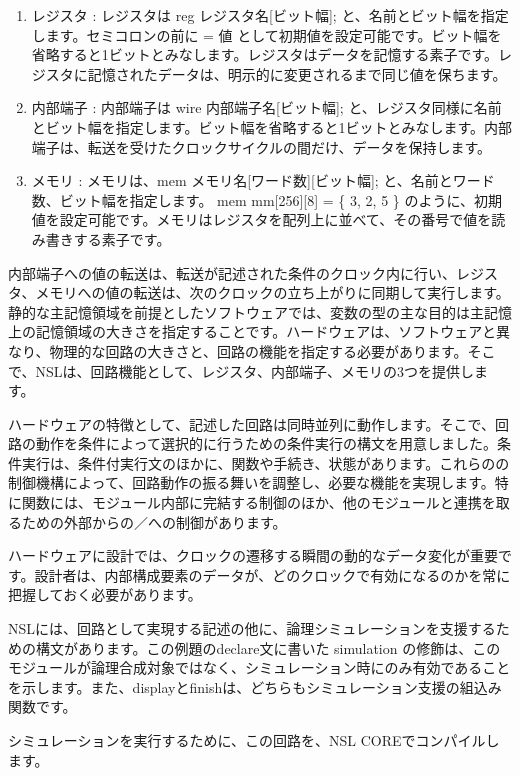 \begin{enumerate}
\item レジスタ  : レジスタは reg  レジスタ名[ビット幅]; と、名前とビット幅を指定します。セミコロンの前に = 値 として初期値を設定可能です。ビット幅を省略すると1ビットとみなします。レジスタはデータを記憶する素子です。レジスタに記憶されたデータは、明示的に変更されるまで同じ値を保ちます。
\item 内部端子 : 内部端子は wire 内部端子名[ビット幅]; と、レジスタ同様に名前とビット幅を指定します。ビット幅を省略すると1ビットとみなします。内部端子は、転送を受けたクロックサイクルの間だけ、データを保持します。
\item メモリ : メモリは、mem メモリ名[ワード数][ビット幅]; と、名前とワード数、ビット幅を指定します。  mem mm[256][8] = \{ 3, 2, 5 \} のように、初期値を設定可能です。メモリはレジスタを配列上に並べて、その番号で値を読み書きする素子です。
\end{enumerate}

内部端子への値の転送は、転送が記述された条件のクロック内に行い、レジスタ、メモリへの値の転送は、次のクロックの立ち上がりに同期して実行します。 静的な主記憶領域を前提としたソフトウェアでは、変数の型の主な目的は主記憶上の記憶領域の大きさを指定することです。ハードウェアは、ソフトウェアと異なり、物理的な回路の大きさと、回路の機能を指定する必要があります。そこで、NSLは、回路機能として、レジスタ、内部端子、メモリの3つを提供します。

ハードウェアの特徴として、記述した回路は同時並列に動作します。そこで、回路の動作を条件によって選択的に行うための条件実行の構文を用意しました。条件実行は、条件付実行文のほかに、関数や手続き、状態があります。これらのの制御機構によって、回路動作の振る舞いを調整し、必要な機能を実現します。特に関数には、モジュール内部に完結する制御のほか、他のモジュールと連携を取るための外部からの／への制御があります。

ハードウェアに設計では、クロックの遷移する瞬間の動的なデータ変化が重要です。設計者は、内部構成要素のデータが、どのクロックで有効になるのかを常に把握しておく必要があります。

NSLには、回路として実現する記述の他に、論理シミュレーションを支援するための構文があります。この例題のdeclare文に書いた simulation の修飾は、このモジュールが論理合成対象ではなく、シミュレーション時にのみ有効であることを示します。また、\textunderscore{}displayと\textunderscore{}finishは、どちらもシミュレーション支援の組込み関数です。

シミュレーションを実行するために、この回路を、NSL COREでコンパイルします。

